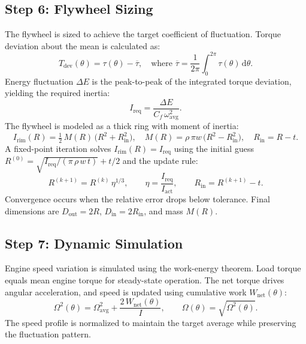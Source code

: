 \documentclass[12pt]{article}
\begin{document}
\subsection{Step 6: Flywheel Sizing}
The flywheel is sized to achieve the target coefficient of fluctuation. Torque deviation about the mean is calculated as:
\begin{equation}
  T_{\text{dev}}(\theta) = \tau(\theta) - \overline{\tau}, \quad \text{where } \overline{\tau} = \frac{1}{2\pi}\int_0^{2\pi} \tau(\theta)\,\mathrm{d}\theta.
\end{equation}
Energy fluctuation \(\Delta E\) is the peak-to-peak of the integrated torque deviation, yielding the required inertia:
\begin{equation}
  I_{\mathrm{req}} = \frac{\Delta E}{C_{f}\,\omega_{\!\text{avg}}^{2}}.
\end{equation}
The flywheel is modeled as a thick ring with moment of inertia:
\begin{equation}
  I_{\mathrm{rim}}(R) = \tfrac{1}{2}\,M(R)\,\bigl(R^{2}+R_{\mathrm{in}}^{2}\bigr),\quad M(R)=\rho\,\pi w\,\bigl(R^{2}-R_{\mathrm{in}}^{2}\bigr),\quad R_{\mathrm{in}}=R-t.
\end{equation}
A fixed-point iteration solves \(I_{\mathrm{rim}}(R)=I_{\mathrm{req}}\) using the initial guess \(R^{(0)} = \sqrt{I_{\mathrm{req}}/(\pi\,\rho\,w\,t)} + t/2\) and the update rule:
\begin{equation}
  R^{(k+1)} = R^{(k)}\,\eta^{1/3},\qquad \eta = \frac{I_{\mathrm{req}}}{I_{\mathrm{act}}},\qquad R_{\mathrm{in}}=R^{(k+1)}-t.
\end{equation}
Convergence occurs when the relative error drops below tolerance. Final dimensions are \(D_{\mathrm{out}}=2R\), \(D_{\mathrm{in}}=2R_{\mathrm{in}}\), and mass \(M(R)\).

\subsection{Step 7: Dynamic Simulation}
Engine speed variation is simulated using the work-energy theorem. Load torque equals mean engine torque for steady-state operation. The net torque drives angular acceleration, and speed is updated using cumulative work \(W_{\text{net}}(\theta)\):
\begin{equation}
  \Omega^{2}(\theta) = \Omega_{\!\text{avg}}^{2} + \frac{2\,W_{\text{net}}(\theta)}{I},\qquad \Omega(\theta) = \sqrt{\Omega^{2}(\theta)}.
\end{equation}
The speed profile is normalized to maintain the target average while preserving the fluctuation pattern.
\end{document}
